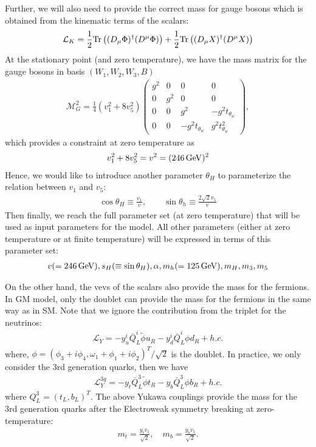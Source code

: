 \documentclass[12pt]{article}
\begin{document}
Further, we will also need to provide the correct mass for gauge bosons which is obtained from the kinematic terms of the scalars:
\begin{align}
\mathcal{L}_K = \frac{1}{2}{\rm Tr}\left((D_\mu\Phi)^\dagger(D^\mu\Phi)\right) + \frac{1}{2}{\rm Tr}\left((D_\mu X)^\dagger (D^\mu X)\right)
\end{align}
At the stationary point (and zero temperature), we have the mass matrix for the gauge bosons in basis $(W_1,W_2,W_3,B)$
\begin{align}
    \mathcal{M}_G^2 = \frac{1}{4}(v_1^2+8v_5^2)\begin{pmatrix}
        g^2 & 0 & 0 & 0 \\
        0 & g^2 & 0 & 0 \\
        0 & 0 & g^2 & -g^2t_{\theta_w} \\
        0 & 0 & -g^2t_{\theta_w} & g^2t_{\theta_w}^2
    \end{pmatrix},
\end{align}
which provides a constraint at zero temperature as
\begin{align}
    v_1^2 + 8v_5^2 = v^2 = (246\,{\rm GeV})^2
\end{align}
Hence, we would like to introduce another parameter $\theta_H$ to parameterize the relation between $v_1$ and $v_5$:
\begin{align}
    \cos\theta_H \equiv \frac{v_1}{v},\qquad  \sin\theta_h \equiv \frac{2\sqrt{2}v_5}{v}
\end{align}
Then finally, we reach the full parameter set (at zero temperature) that will be used as input parameters for the model. All other parameters (either at zero temperature or at finite temperature) will be expressed in terms of this parameter set:
\begin{align}
    v(=246\,{\rm GeV}), s_H(\equiv \sin\theta_H), \alpha, m_h(=125\,{\rm GeV}), m_H, m_3, m_5
\end{align}

On the other hand, the vevs of the scalars also provide the mass for the fermions. In GM model, only the doublet can provide the mass for the fermions in the same way as in SM. Note that we ignore the contribution from the triplet for the neutrinos:
\begin{align}
    \mathcal{L}_Y = -y_u^i \bar{Q}_L^i\tilde{\phi}u_R - y_d^i \bar{Q}_L^i\phi d_R + h.c.
\end{align}
where, $\phi = (\phi_3+i\phi_4, \omega_1+\phi_1+i\phi_2)^T/\sqrt{2}$ is the doublet. In practice, we only consider the 3rd generation quarks, then we have
\begin{align}
    \mathcal{L}_Y^{3q} = -y_t \bar{Q}_L^3\tilde{\phi}t_R - y_b \bar{Q}_L^3 \phi b_R +h.c.
\end{align}
where $Q_L^3 = (t_L, b_L)^T$. The above Yukawa couplings provide the mass for the 3rd generation quarks after the Electroweak symmetry breaking at zero-temperature:
\begin{align}
    m_t = \frac{y_tv_1}{\sqrt{2}},\quad m_b = \frac{y_bv_1}{\sqrt{2}}.
\end{align}
\end{document}
